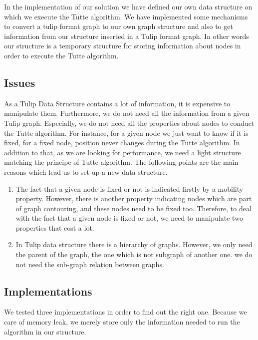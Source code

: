 In the implementation of our solution we have defined our own data
structure on which we execute the Tutte algorithm. We have
implemented some mechanisms to convert a tulip format graph to our own
graph structure and also to get information from our structure
inserted in a Tulip format graph. In other words our structure is a
temporary structure for storing information about nodes in order to
execute the Tutte algorithm.

\subsection{Issues}
As a Tulip Data Structure contains a lot of information, it is
expensive to manipulate them. Furthermore, we do not need all the
information from a given Tulip graph. Especially, we do not need all
the properties about nodes to conduct the Tutte algorithm. For
instance, for a given node we just want to know if it is fixed, for a
fixed node, position never changes during the Tutte algorithm. In
addition to that, as we are looking for performance, we need a light
structure matching the principe of Tutte algorithm. The following
points are the main reasons which lead us to set up a new data
structure.
\begin{enumerate}
\item The fact that a given node is fixed or not is indicated firstly
  by a mobility property. However, there is another property indicating
  nodes which are part of graph contouring, and these nodes need to be
  fixed too. Therefore, to deal with the fact that a given node is fixed or
  not, we need to manipulate two properties that cost a lot.

\item In Tulip data structure there is a hierarchy of graphs. However, we only need
  the parent of the graph, the one which is not subgraph of another
  one. we do not need the sub-graph relation between graphs.


\end{enumerate}  

\subsection{Implementations}
We tested three implementations in order to find out the right one. Because we care of memory leak, we merely store only the information needed to run the algorithm in our structure.

